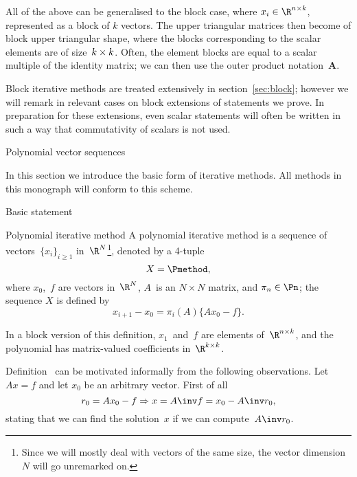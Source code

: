 \begin{block}
All of the above can be generalised to the block case,
where $x_i\in\R^{n\times k}$, represented as a block of $k$ vectors.
The upper triangular matrices then become of block upper triangular
shape, where the blocks corresponding to the scalar
elements are of size~$k\times\nobreak k$. Often, the element blocks
are equal to a scalar multiple of the identity matrix; we can then
use the outer product notation~$\bm{A}$.

Block iterative methods are treated extensively in
section~\ref{sec:block}; however we will remark in relevant cases on
block extensions of statements we prove.  In preparation for these
extensions, even scalar statements will often be written in such a way
that commutativity of scalars is not used.
\end{block}

 {Polynomial vector sequences}

In this section we introduce the basic form of iterative methods. All
methods in this monograph will conform to this scheme.

 {Basic statement}

\begin{precond}
\begin{ddefinition}{Polynomial iterative method}
\label{def:poly-it}
A polynomial iterative method is a sequence of
vectors~$\{x_i\}_{i\geq1}$ in~$\R^N$\footnote
{Since we will mostly deal with vectors of the same size, the vector dimension~$N$
will go unremarked on.}, denoted by a
4-tuple \[X=\Pmethod,\] where $x_0$,~$f$ are vectors
in~$\R^N$, $A$~is an $N\times N$ matrix, and $\pi_n\in\Pn$;
the sequence $X$ is defined by
        \begin{equation} x_{i+1}-x_0=\pi_i(A)\{Ax_0-f\}.
        \label{eq:poly-meth_1}
        \end{equation}
\end{ddefinition}
\end{precond}

\begin{block}
In a block version of this definition, $x_1$~and~$f$ are elements
of~$\R^{n\times k}$, and the polynomial has matrix-valued coefficients
in~$\R^{k\times k}$.
\end{block}

Definition~
can be motivated informally from the following
observations. Let $Ax=f$ and let $x_0$ be an arbitrary vector.
First of all
        \[ r_0=Ax_0-f\Rightarrow x=A\inv f=x_0-A\inv r_0,\]
stating that we can find the solution~$x$ if we can compute~$A\inv r_0$.

